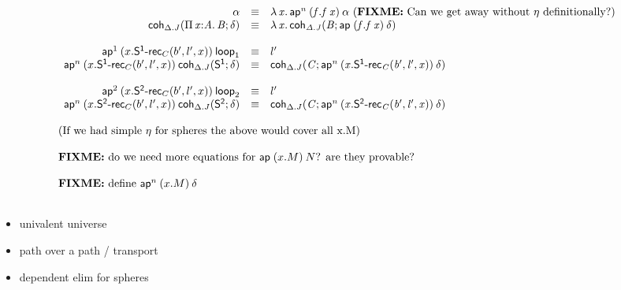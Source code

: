 \begin{small}
\[\begin{array}{l}
\begin{array}{rcl}
\alpha & \equiv & \mathit{\lambda\,x.\,\mathsf{ap}^{n} \: {(f.\mathit{f \: x})} \: {\alpha}} \text{ (\textbf{FIXME:} Can we get away without $\eta$ definitionally?)} \\

\mathsf{coh}_{\Delta.J} \mathit{(\textnormal{$\Pi$}\,\mathit{x} \mathit{:} \mathit{A}.\,\mathit{B};\delta)} & \equiv & \mathit{\lambda\,x.\,\mathsf{coh}_{\Delta.J} \mathit{(B;\mathsf{ap}^{} \: {(f.\mathit{f \: x})} \: {\delta})}} \\
\\ 

\mathsf{ap}^{1} \: {(x.\mathsf{S^{1}\text{-}rec}_{C}(b',l',x))} \: {\mathsf{loop}_{1}} & \equiv & l' \\

\mathsf{ap}^{n} \: {(x.\mathsf{S^{1}\text{-}rec}_{C}(b',l',x))} \: {\mathsf{coh}_{\text{\ensuremath{\Delta}}.J} \mathit{(\mathsf{S^1};\delta)}} & \equiv & 
\mathsf{coh}_{\Delta.J} \mathit{(C;\mathsf{ap}^{n} \: {(x.\mathsf{S^{1}\text{-}rec}_{C}(b',l',x))} \: {\delta})} \\

\\ 

\mathsf{ap}^{2} \: {(x.\mathsf{S^{2}\text{-}rec}_{C}(b',l',x))} \: {\mathsf{loop}_{2}} & \equiv & l' \\

\mathsf{ap}^{n} \: {(x.\mathsf{S^{2}\text{-}rec}_{C}(b',l',x))} \: {\mathsf{coh}_{\text{\ensuremath{\Delta}}.J} \mathit{(\mathsf{S^2};\delta)}} & \equiv & 
\mathsf{coh}_{\Delta.J} \mathit{(C;\mathsf{ap}^{n} \: {(x.\mathsf{S^{2}\text{-}rec}_{C}(b',l',x))} \: {\delta})} \\
\end{array}
\\ \\
\text{(If we had simple $\eta$ for spheres the above would cover all x.M)}
\\ \\
\text{\textbf{FIXME:} do we need more equations for \ensuremath{\mathsf{ap}^{} \: {(x.M)} \: {N}}? are
    they provable?}
\\ \\
\text{\textbf{FIXME:} define \ensuremath{\mathsf{ap}^{n} \: {(x.M)} \: {\delta}}}

\\ \\
\end{array}
\]
\end{small}

\noindent
{}
\begin{small}
\begin{itemize}
\item univalent universe
\item path over a path / transport
\item dependent elim for spheres
\end{itemize}
\end{small}

%



